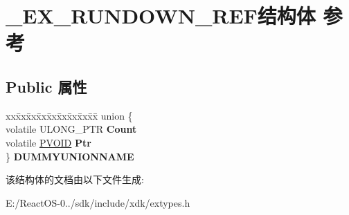 \hypertarget{struct___e_x___r_u_n_d_o_w_n___r_e_f}{}\section{\+\_\+\+E\+X\+\_\+\+R\+U\+N\+D\+O\+W\+N\+\_\+\+R\+E\+F结构体 参考}
\label{struct___e_x___r_u_n_d_o_w_n___r_e_f}
\subsection*{Public 属性}
\begin{DoxyCompactItemize}
\item 
\mbox{\label{struct___e_x___r_u_n_d_o_w_n___r_e_f_a1fc97e01676f6945b199d832ee2eba3a}} 
\begin{tabbing}
xx\=xx\=xx\=xx\=xx\=xx\=xx\=xx\=xx\=\kill
union \{\\
\>volatile ULONG\_PTR {\bfseries Count}\\
\>volatile \hyperlink{interfacevoid}{PVOID} {\bfseries Ptr}\\
\} {\bfseries DUMMYUNIONNAME}\\

\end{tabbing}\end{DoxyCompactItemize}


该结构体的文档由以下文件生成\+:\begin{DoxyCompactItemize}
\item 
E\+:/\+React\+O\+S-\/0../sdk/include/xdk/extypes.\+h\end{DoxyCompactItemize}

